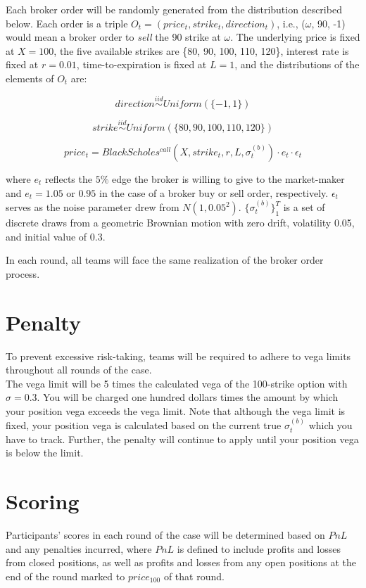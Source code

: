 \documentclass{amsart}
\renewcommand{\_}[1]{\underline{ #1 }}
\theoremstyle{definition}
\numberwithin{equation}{subsection}
\begin{document}
Each broker order will be randomly generated from the distribution described below. Each order is a triple $O_t=(price_t, strike_t, direction_t)$, i.e., ($\omega$, 90, -1) would mean a broker order to {\it sell} the 90 strike at $\omega$. The underlying price is fixed at $X=100$, the five available strikes are \{80, 90, 100, 110, 120\}, interest rate is fixed at $r=0.01$, time-to-expiration is fixed at $L=1$, and the distributions of the elements of $O_t$ are:

$$direction \overset{iid}{\sim} Uniform(\{-1,1\})$$

$$strike \overset{iid}{\sim} Uniform(\{80,90,100,110,120\})$$

$$price_t=BlackScholes^{call}(X,strike_t,r,L,\sigma_t^{(b)})\cdot e_t\cdot \epsilon_t$$

where $e_t$ reflects the $5\%$ edge the broker is willing to give to the market-maker and $e_t=1.05$ or $0.95$ in the case of a broker buy or sell order, respectively. $\epsilon_t$ serves as the noise parameter drew from $N(1,0.05^2)$.
$\{\sigma_t^{(b)}\}_1^T $ is a set of discrete draws from a geometric Brownian motion with zero drift, volatility 0.05, and initial value of 0.3. 


In each round, all teams will face the same realization of the broker order process. 

\section{Penalty}
To prevent excessive risk-taking, teams will be required to adhere to vega limits throughout all rounds of the case. 
\\

The vega limit will be 5 times the calculated vega of the 100-strike option with $\sigma = 0.3$. You will be charged one hundred dollars times the amount by which your position vega exceeds the vega limit. Note that although the vega limit is fixed, your position vega is calculated based on the current true $\sigma_t^{(b)}$ which you have to track. Further, the penalty will continue to apply until your position vega is below the limit. 

\section{Scoring}

Participants' scores in each round of the case will be determined based on $PnL$ and any penalties incurred, where $PnL$ is defined to include profits and losses from closed positions, as well as profits and losses from any open positions at the end of the round marked to $price_{100}$ of that round. 
\\
\end{document}
